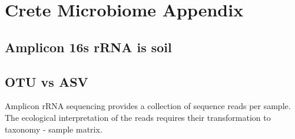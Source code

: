 
\chapter{Crete Microbiome Appendix} %

\label{AppendixC} 

\section{Amplicon 16s rRNA is soil}


\section{OTU vs ASV}

Amplicon rRNA sequencing provides a collection of sequence reads per sample. 
The ecological interpretation of the reads requires their transformation to
taxonomy - sample matrix.

